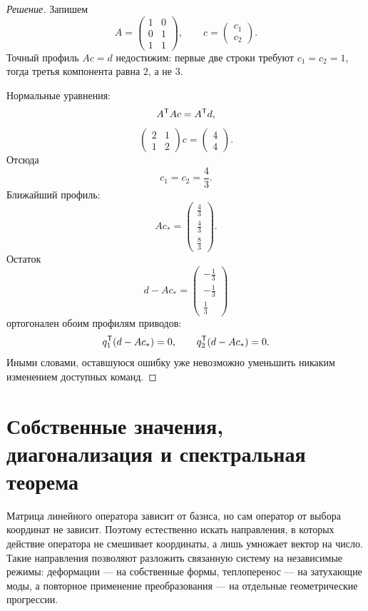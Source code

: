 \begin{proof}[Решение]
Запишем
\[
A=
\begin{pmatrix}
1&0\\
0&1\\
1&1
\end{pmatrix},
\qquad
c=
\begin{pmatrix}
c_1\\c_2
\end{pmatrix}.
\]
Точный профиль \(Ac=d\) недостижим: первые две строки требуют
\(c_1=c_2=1\), тогда третья компонента равна \(2\), а не \(3\).

Нормальные уравнения:
\[
A^{\mathsf{T}}A c=A^{\mathsf{T}}d,
\]
\[
\begin{pmatrix}
2&1\\
1&2
\end{pmatrix}
c
=
\begin{pmatrix}
4\\4
\end{pmatrix}.
\]
Отсюда
\[
c_1=c_2=\frac43.
\]
Ближайший профиль:
\[
Ac_\ast
=
\begin{pmatrix}
\frac43\\[1mm]
\frac43\\[1mm]
\frac83
\end{pmatrix}.
\]
Остаток
\[
d-Ac_\ast
=
\begin{pmatrix}
-\frac13\\[1mm]
-\frac13\\[1mm]
\frac13
\end{pmatrix}
\]
ортогонален обоим профилям приводов:
\[
q_1^{\mathsf{T}}(d-Ac_\ast)=0,
\qquad
q_2^{\mathsf{T}}(d-Ac_\ast)=0.
\]
Иными словами, оставшуюся ошибку уже невозможно уменьшить никаким изменением доступных команд.
\end{proof}

\section{Собственные значения, диагонализация и спектральная теорема}
\label{sec:eigenvalues-spectral-theorem}

Матрица линейного оператора зависит от базиса, но сам оператор от выбора координат не зависит. Поэтому естественно искать направления, в которых действие оператора не смешивает координаты, а лишь умножает вектор на число. Такие направления позволяют разложить связанную систему на независимые режимы: деформации --- на собственные формы, теплоперенос --- на затухающие моды, а повторное применение преобразования --- на отдельные геометрические прогрессии.

